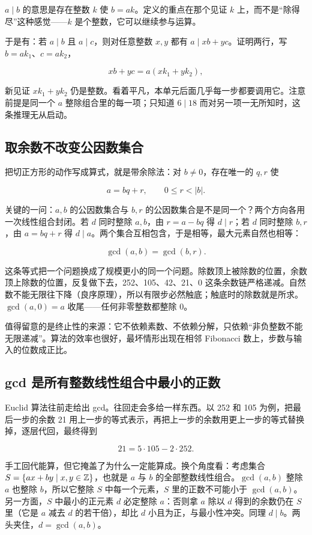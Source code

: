 \(a\mid b\) 的意思是存在整数 \(k\) 使 \(b=ak\)。定义的重点在那个见证 \(k\) 上，而不是``除得尽''这种感觉——\(k\) 是个整数，它可以继续参与运算。

于是有：若 \(a\mid b\) 且 \(a\mid c\)，则对任意整数 \(x,y\) 都有 \(a\mid xb+yc\)。证明两行，写 \(b=ak_1\)、\(c=ak_2\)，

\[
xb+yc=a(xk_1+yk_2),
\]

新见证 \(xk_1+yk_2\) 仍是整数。看着平凡，本单元后面几乎每一步都要调用它。注意前提是同一个 \(a\) 整除组合里的每一项；只知道 \(6\mid 18\) 而对另一项一无所知时，这条推理无从启动。

\subsection{取余数不改变公因数集合}

把切正方形的动作写成算式，就是带余除法：对 \(b\neq0\)，存在唯一的 \(q,r\) 使

\[
a=bq+r,\qquad 0\le r<|b|.
\]

关键的一问：\(a,b\) 的公因数集合与 \(b,r\) 的公因数集合是不是同一个？两个方向各用一次线性组合封闭。若 \(d\) 同时整除 \(a,b\)，由 \(r=a-bq\) 得 \(d\mid r\)；若 \(d\) 同时整除 \(b,r\)，由 \(a=bq+r\) 得 \(d\mid a\)。两个集合互相包含，于是相等，最大元素自然也相等：

\[
\gcd(a,b)=\gcd(b,r).
\]

这条等式把一个问题换成了规模更小的同一个问题。除数顶上被除数的位置，余数顶上除数的位置，反复做下去，252、105、42、21、0 这条余数链严格递减。自然数不能无限往下降（良序原理），所以有限步必然触底；触底时的除数就是所求。\(\gcd(a,0)=a\) 收尾——任何非零整数都整除 0。

值得留意的是终止性的来源：它不依赖素数、不依赖分解，只依赖``非负整数不能无限递减''。算法的效率也很好，最坏情形出现在相邻 Fibonacci 数上，步数与输入的位数成正比。

\subsection{gcd 是所有整数线性组合中最小的正数}

Euclid 算法往前走给出 gcd。往回走会多给一样东西。以 252 和 105 为例，把最后一步的余数 21 用上一步的等式表示，再把上一步的余数用更上一步的等式替换掉，逐层代回，最终得到

\[
21=5\cdot105-2\cdot252.
\]

手工回代能算，但它掩盖了为什么一定能算成。换个角度看：考虑集合 \(S=\left\{ax+by\mid x,y\in\mathbb{Z}\right\}\)，也就是 \(a\) 与 \(b\) 的全部整数线性组合。\(\gcd(a,b)\) 整除 \(a\) 也整除 \(b\)，所以它整除 \(S\) 中每一个元素，\(S\) 里的正数不可能小于 \(\gcd(a,b)\)。另一方面，\(S\) 中最小的正元素 \(d\) 必定整除 \(a\)：否则拿 \(a\) 除以 \(d\) 得到的余数仍在 \(S\) 里（它是 \(a\) 减去 \(d\) 的若干倍），却比 \(d\) 小且为正，与最小性冲突。同理 \(d\mid b\)。两头夹住，\(d=\gcd(a,b)\)。

